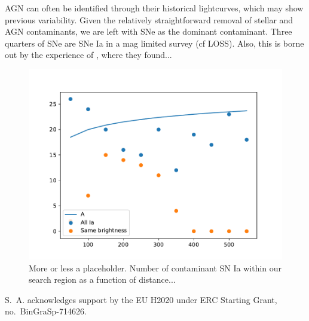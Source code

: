 \documentclass{aa}
\begin{document}
AGN can often be identified through their historical lightcurves, which may show previous variability. Given the relatively straightforward removal of stellar and AGN contaminants, we are left with SNe as the dominant contaminant. Three quarters of SNe are SNe Ia in a mag limited survey (cf LOSS). Also, this is borne out by the experience of \cite{Smar16}, where they found...




\begin{figure}[h]
\includegraphics[width=\linewidth]{plot.pdf}
\caption{More or less a placeholder. Number of contaminant SN Ia within our search region as a function of distance...
}
\label{fig:SNIa}
\end{figure}




\begin{acknowledgements}
 S.~A. acknowledges support by the EU H2020 under ERC Starting Grant, no.~BinGraSp-714626.
\end{acknowledgements}




\end{document}
